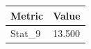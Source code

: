 \begin{tabular}{ll}
\toprule
Metric & Value \\
\midrule
Stat\_9 & 13.500 \\
\bottomrule
\end{tabular}